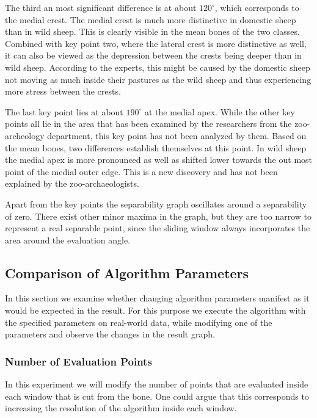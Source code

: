 \documentclass[pdftex,12pt,a4paper]{report}
\begin{document}
The third an most significant difference is at about $120^\circ$, which corresponds to the medial crest. The medial crest is much more distinctive in domestic sheep than in wild sheep. This is clearly visible in the mean bones of the two classes. Combined with key point two, where the lateral crest is more distinctive as well, it can also be viewed as the depression between the crests being deeper than in wild sheep. According to the experts, this might be caused by the domestic sheep not moving as much inside their pastures as the wild sheep and thus experiencing more stress between the crests.

The last key point lies at about $190^\circ$ at the medial apex. While the other key points all lie in the area that has been examined by the researchers from the zoo-archeology department, this key point has not been analyzed by them. Based on the mean bones, two differences establish themselves at this point. In wild sheep the medial apex is more pronounced as well as shifted lower towards the out most point of the medial outer edge. This is a new discovery and has not been explained by the zoo-archaeologists.

Apart from the key points the separability graph oscillates around a separability of zero. There exist other minor maxima in the graph, but they are too narrow to represent a real separable point, since the sliding window always incorporates the area around the evaluation angle.



\subsection{Comparison of Algorithm Parameters}
\label{sub:comparisonalgorithmparameters}

In this section we examine whether changing algorithm parameters manifest as it would be expected in the result. For this purpose we execute the algorithm with the specified parameters on real-world data, while modifying one of the parameters and observe the changes in the result graph.

\subsubsection{Number of Evaluation Points}

In this experiment we will modify the number of points that are evaluated inside each window that is cut from the bone. One could argue that this corresponds to increasing the resolution of the algorithm inside each window.
\end{document}
